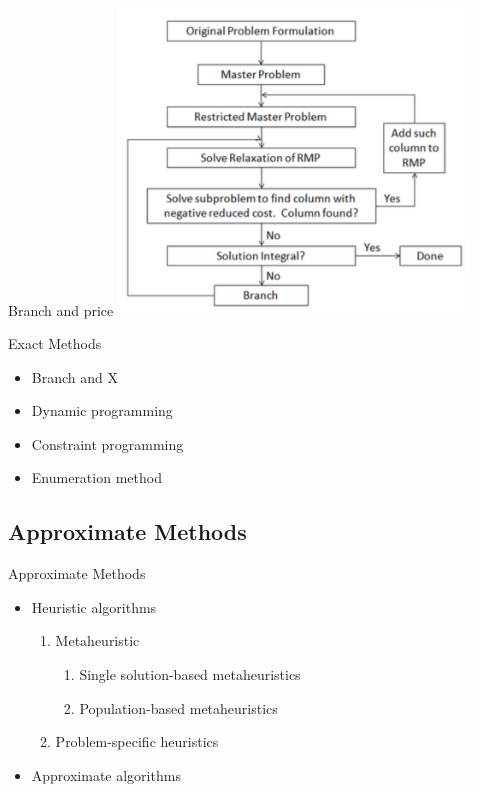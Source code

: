     \begin{frame}{Branch and price}
      \centering
      \includegraphics[width = 0.7\textwidth]{images/branch_price.png}
    \end{frame}

    \begin{frame}{Exact Methods}
      \begin{itemize}
        \item Branch and X
        \item<+-> Dynamic programming
        \item<+-> Constraint programming
        \item<+-> Enumeration method
      \end{itemize}
    \end{frame}



    \subsection{Approximate Methods}
    \frame{\sectionpage}

    \begin{frame}{Approximate Methods}
      \begin{itemize}
        \item Heuristic algorithms
        \vspace{4pt}
        \begin{enumerate}
          \item<+->  Metaheuristic
            \begin{enumerate}
              \item<+>[*] Single solution-based metaheuristics
              \item<+>[*] Population-based metaheuristics
            \end{enumerate}
          \vspace{4pt}
          \item<+->  Problem-specific heuristics
        \end{enumerate}
        \vspace{4pt}
        \item<+-> Approximate algorithms
      \end{itemize}
    \end{frame}

